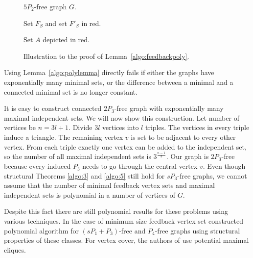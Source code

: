 \begin{figure}
\centering
\begin{minipage}{.45\textwidth}
	\centering
	
	\caption*{\(5P_2\)-free graph \(G\).}
\end{minipage}
\begin{minipage}{.45\textwidth}
	\centering
	
	\caption*{Set \(F_S\) and set \(F'_S\) in red.}
\end{minipage}
\begin{minipage}{.45\textwidth}
	\centering
	
	\caption*{Set \(A\) depicted in red.}
\end{minipage}
	\caption{Illustration to the proof of Lemma~\ref{algo:feedbackpoly}.}
	\label{fig:fsprime}
\end{figure}

Using Lemma~\ref{algo:polylemma} directly fails 
if either the graphs have exponentially many minimal sets, or the difference between a minimal and a connected minimal set is no longer constant.

It is easy to construct connected \(2P_3\)-free graph with exponentially many maximal independent sets.
We will now show this construction. Let number of vertices be \(n = 3l + 1\).  
Divide \(3l\) vertices into \(l\) triples. The vertices in every triple induce a triangle. 
The remaining vertex \(v\) is set to be adjacent to every other vertex.
From each triple exactly one vertex can be added to the independent set, 
so the number of all maximal independent sets is \(3^{\frac{n-1}{3}}\).
Our graph is \(2P_3\)-free because every induced \(P_3\) needs to go through the central vertex \(v\).
Even though structural Theorems \ref{algo:3} and \ref{algo:5} still hold for \(sP_3\)-free graphs, we cannot assume 
that the number of minimal feedback vertex sets and maximal independent sets is polynomial in a number of vertices of \(G\).

Despite this fact there are still polynomial results for these problems using various techniques.
In the case of minimum size feedback vertex set \citet{Dabrowski20} constructed polynomial algorithm for \((sP_1 + P_3)\)-free and \(P_4\)-free graphs using structural properties of these classes.
For vertex cover, the authors of \cite{Grzesik19} use potential maximal cliques.
